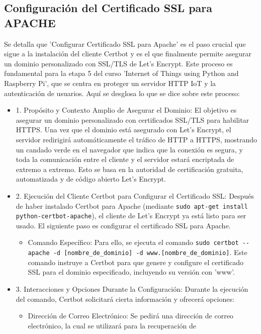 \documentclass{report}
\begin{document}
\subsection{Configuración del Certificado SSL para APACHE}
Se detalla que 'Configurar Certificado SSL para Apache' es el paso crucial que sigue a la instalación del cliente Certbot 
y es el que finalmente permite asegurar un dominio personalizado con SSL/TLS de Let's Encrypt. Este proceso es fundamental para la 
etapa 5 del curso 'Internet of Things using Python and Raspberry Pi', que se centra en proteger un servidor HTTP IoT y la 
autenticación de usuarios.
Aquí se desglosa lo que se  dice sobre este proceso:
\begin{itemize}
    \item 1. Propósito y Contexto Amplio de Asegurar el Dominio: El objetivo es asegurar un dominio personalizado con certificados 
    SSL/TLS para habilitar HTTPS. Una vez que el dominio está asegurado con Let's Encrypt, el servidor redirigirá automáticamente el 
    tráfico de HTTP a HTTPS, mostrando un candado verde en el navegador que indica que la conexión es segura, y toda la comunicación entre 
    el cliente y el servidor estará encriptada de extremo a extremo. Esto se basa en la autoridad de certificación gratuita, automatizada y 
    de código abierto Let's Encrypt.
    \item 2. Ejecución del Cliente Certbot para Configurar el Certificado SSL: Después de haber instalado Certbot para Apache 
    (mediante \verb|sudo apt-get install python-certbot-apache|), el cliente de Let's Encrypt ya está listo para ser usado. El siguiente 
    paso es configurar el certificado SSL para Apache.
        \begin{itemize}
            \item Comando Específico: Para ello, se ejecuta el comando \verb|sudo certbot --apache -d [nombre_de_dominio] -d www.[nombre_de_dominio]|. 
            Este comando instruye a Certbot para que genere y configure el certificado SSL para el dominio especificado, incluyendo su 
            versión con 'www'.        
        \end{itemize}
    \item 3. Interacciones y Opciones Durante la Configuración: Durante la ejecución del comando, Certbot solicitará cierta información y 
    ofrecerá opciones:
        \begin{itemize}
            \item Dirección de Correo Electrónico: Se pedirá una dirección de correo electrónico, la cual se utilizará para la recuperación de 

\end{itemize}
\end{itemize}
\end{document}
